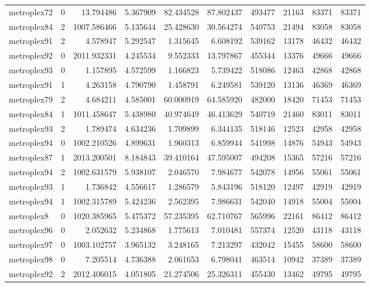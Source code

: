 \begin{longtable}{|l|r|r|r|r|r|r|r|r|r|}
metroplex72 & 0 & 13.794486 & 5.367909 & 82.434528 & 87.802437 & 493477 & 21163 & 83371 & 83371 \\
metroplex84 & 2 & 1007.586466 & 5.135644 & 25.428630 & 30.564274 & 540753 & 21494 & 83058 & 83058 \\
metroplex91 & 2 & 4.578947 & 5.292547 & 1.315645 & 6.608192 & 539162 & 13178 & 46432 & 46432 \\
metroplex92 & 0 & 2011.932331 & 4.245534 & 9.552333 & 13.797867 & 455344 & 13376 & 49666 & 49666 \\
metroplex93 & 0 & 1.157895 & 4.572599 & 1.166823 & 5.739422 & 518086 & 12463 & 42868 & 42868 \\
metroplex91 & 1 & 4.263158 & 4.790790 & 1.458791 & 6.249581 & 539120 & 13136 & 46369 & 46369 \\
metroplex79 & 2 & 4.684211 & 4.585001 & 60.000919 & 64.585920 & 482000 & 18420 & 71453 & 71453 \\
metroplex84 & 1 & 1011.458647 & 5.438980 & 40.974649 & 46.413629 & 540719 & 21460 & 83011 & 83011 \\
metroplex93 & 2 & 1.789474 & 4.634236 & 1.709899 & 6.344135 & 518146 & 12523 & 42958 & 42958 \\
metroplex94 & 0 & 1002.210526 & 4.899631 & 1.960313 & 6.859944 & 541998 & 14876 & 54943 & 54943 \\
metroplex87 & 1 & 2013.200501 & 8.184843 & 39.410164 & 47.595007 & 494208 & 15365 & 57216 & 57216 \\
metroplex94 & 2 & 1002.631579 & 5.938107 & 2.046570 & 7.984677 & 542078 & 14956 & 55061 & 55061 \\
metroplex93 & 1 & 1.736842 & 4.556617 & 1.286579 & 5.843196 & 518120 & 12497 & 42919 & 42919 \\
metroplex94 & 1 & 1002.315789 & 5.424236 & 2.562395 & 7.986631 & 542040 & 14918 & 55004 & 55004 \\
metroplex8 & 0 & 1020.385965 & 5.475372 & 57.235395 & 62.710767 & 565996 & 22161 & 86412 & 86412 \\
metroplex96 & 0 & 2.052632 & 5.234868 & 1.775613 & 7.010481 & 557374 & 12520 & 43118 & 43118 \\
metroplex97 & 0 & 1003.102757 & 3.965132 & 3.248165 & 7.213297 & 432042 & 15455 & 58600 & 58600 \\
metroplex98 & 0 & 7.205514 & 4.736388 & 2.061653 & 6.798041 & 463514 & 10942 & 37389 & 37389 \\
metroplex92 & 2 & 2012.406015 & 4.051805 & 21.274506 & 25.326311 & 455430 & 13462 & 49795 & 49795 \\

\end{longtable}
